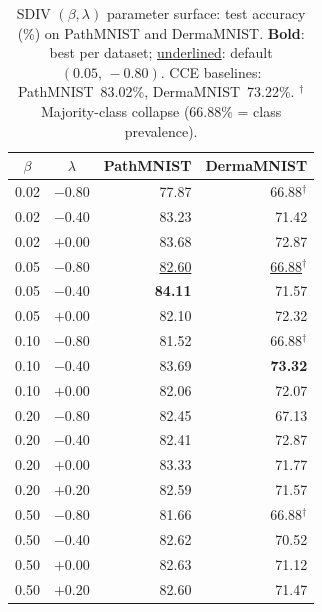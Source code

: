 \begin{table}[t]
\centering
\caption{%
SDIV $(\beta,\lambda)$ parameter surface: test accuracy (\%) on PathMNIST
and DermaMNIST.
\textbf{Bold}: best per dataset; \underline{underlined}: default $(0.05,\,-0.80)$.
CCE baselines: PathMNIST~83.02\%, DermaMNIST~73.22\%.
$^{\dagger}$Majority-class collapse (66.88\% = class prevalence).
}
\label{tab:sdiv_surface}
\small
\setlength{\tabcolsep}{5pt}
\begin{tabular}{@{}cc rr@{}}
\toprule
$\beta$ & $\lambda$ & \textbf{PathMNIST} & \textbf{DermaMNIST} \\
\midrule
0.02 & $-$0.80 & 77.87               & 66.88$^{\dagger}$ \\
0.02 & $-$0.40 & 83.23               & 71.42             \\
0.02 & $+$0.00 & 83.68               & 72.87             \\
\midrule
0.05 & $-$0.80 & \underline{82.60}   & \underline{66.88}$^{\dagger}$ \\
0.05 & $-$0.40 & \textbf{84.11}      & 71.57             \\
0.05 & $+$0.00 & 82.10               & 72.32             \\
\midrule
0.10 & $-$0.80 & 81.52               & 66.88$^{\dagger}$ \\
0.10 & $-$0.40 & 83.69               & \textbf{73.32}    \\
0.10 & $+$0.00 & 82.06               & 72.07             \\
\midrule
0.20 & $-$0.80 & 82.45               & 67.13             \\
0.20 & $-$0.40 & 82.41               & 72.87             \\
0.20 & $+$0.00 & 83.33               & 71.77             \\
0.20 & $+$0.20 & 82.59               & 71.57             \\
\midrule
0.50 & $-$0.80 & 81.66               & 66.88$^{\dagger}$ \\
0.50 & $-$0.40 & 82.62               & 70.52             \\
0.50 & $+$0.00 & 82.63               & 71.12             \\
0.50 & $+$0.20 & 82.60               & 71.47             \\
\bottomrule
\end{tabular}
\end{table}

